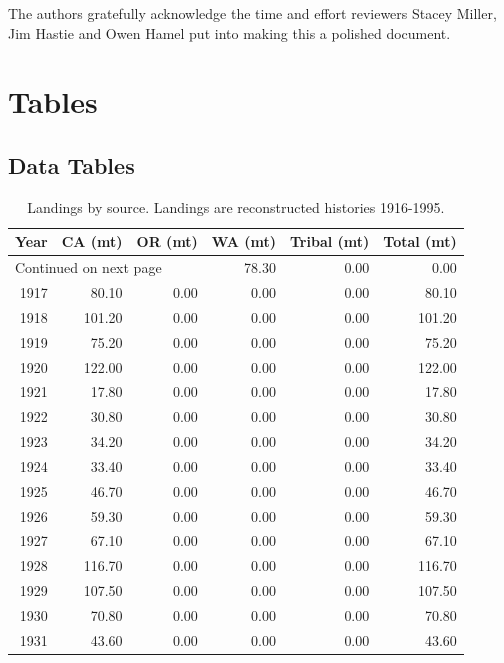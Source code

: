 \documentclass[12pt,]{article}
\begin{document}
The authors gratefully acknowledge the time and effort reviewers Stacey
Miller, Jim Hastie and Owen Hamel put into making this a polished
document.

\newpage
\FloatBarrier
\newpage

\hypertarget{tables}{%
\section{Tables}\label{tables}}

\hypertarget{data-tables}{%
\subsection{Data Tables}\label{data-tables}}

\begin{longtable}{rrrrrr}
\caption{Landings by source.  Landings are reconstructed histories 1916-1995.} \\ 
  \hline
Year & CA (mt) & OR (mt) & WA (mt) & Tribal (mt) & Total (mt) \\ 
  \hline 
\endhead 
\hline 
\multicolumn{3}{l}{\footnotesize Continued on next page} 
\endfoot 
\endlastfoot 
 \hline
1916 & 78.30 & 0.00 & 0.00 & 0.00 & 78.30 \\ 
  1917 & 80.10 & 0.00 & 0.00 & 0.00 & 80.10 \\ 
  1918 & 101.20 & 0.00 & 0.00 & 0.00 & 101.20 \\ 
  1919 & 75.20 & 0.00 & 0.00 & 0.00 & 75.20 \\ 
  1920 & 122.00 & 0.00 & 0.00 & 0.00 & 122.00 \\ 
  1921 & 17.80 & 0.00 & 0.00 & 0.00 & 17.80 \\ 
  1922 & 30.80 & 0.00 & 0.00 & 0.00 & 30.80 \\ 
  1923 & 34.20 & 0.00 & 0.00 & 0.00 & 34.20 \\ 
  1924 & 33.40 & 0.00 & 0.00 & 0.00 & 33.40 \\ 
  1925 & 46.70 & 0.00 & 0.00 & 0.00 & 46.70 \\ 
  1926 & 59.30 & 0.00 & 0.00 & 0.00 & 59.30 \\ 
  1927 & 67.10 & 0.00 & 0.00 & 0.00 & 67.10 \\ 
  1928 & 116.70 & 0.00 & 0.00 & 0.00 & 116.70 \\ 
  1929 & 107.50 & 0.00 & 0.00 & 0.00 & 107.50 \\ 
  1930 & 70.80 & 0.00 & 0.00 & 0.00 & 70.80 \\ 
  1931 & 43.60 & 0.00 & 0.00 & 0.00 & 43.60 \\ 

\end{longtable}
\end{document}
